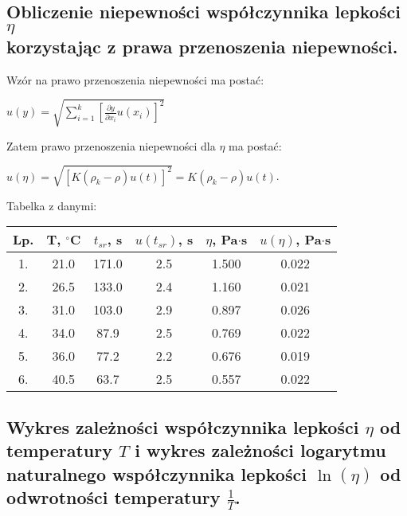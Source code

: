 \documentclass[12pt]{article}
\begin{document}
\subsection*{Obliczenie niepewności współczynnika lepkości
    $\eta$ \\
    korzystając z prawa przenoszenia niepewności.}

Wzór na prawo przenoszenia niepewności ma postać:
\begin{center}
    $u(y) = \sqrt{\sum_{i=1}^{k}[\frac{\partial y}{\partial x_i}u(x_i)]^2}$
\end{center}
Zatem prawo przenoszenia niepewności dla $\eta$ ma postać:
\begin{center}
    $u(\eta) = \sqrt{ [K(\rho_k - \rho)u(t)]^2 } = K(\rho_k - \rho)u(t)$.
\end{center}
Tabelka z danymi:
\begin{center}
    \begin{tabular}{ | c | c | c | c | c | c | }
        \hline
        Lp. & T, $^{\circ}$C & $t_{sr}$, s & $u(t_{sr})$, s & $\eta$, Pa$\cdot$s & $u(\eta)$, Pa$\cdot$s \\ \hline
        1.  & 21.0           & 171.0       & 2.5            & 1.500              & 0.022                 \\ \hline
        2.  & 26.5           & 133.0       & 2.4            & 1.160              & 0.021                 \\ \hline
        3.  & 31.0           & 103.0       & 2.9            & 0.897              & 0.026                 \\ \hline
        4.  & 34.0           & 87.9        & 2.5            & 0.769              & 0.022                 \\ \hline
        5.  & 36.0           & 77.2        & 2.2            & 0.676              & 0.019                 \\ \hline
        6.  & 40.5           & 63.7        & 2.5            & 0.557              & 0.022                 \\ \hline
    \end{tabular}
\end{center}

\subsection*{Wykres zależności współczynnika lepkości $\eta$ od \\
    temperatury $T$ i wykres zależności logarytmu \\
    naturalnego współczynnika lepkości $\ln(\eta)$ od \\
    odwrotności temperatury $\frac{1}{T}$.}
\end{document}
